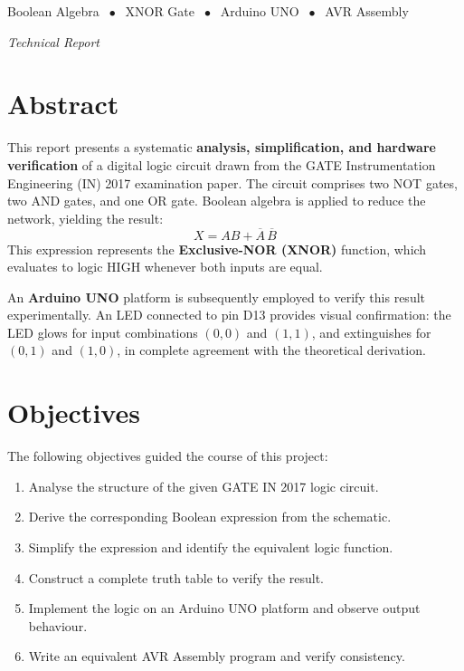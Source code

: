 \documentclass[12pt,a4paper]{article}
\begin{document}
\begin{titlepage}
\begin{center}
\vfill

\textcolor{accentblue}{%
Boolean Algebra $\;\bullet\;$
XNOR Gate $\;\bullet\;$
Arduino UNO $\;\bullet\;$
AVR Assembly
}

\vspace{0.3cm}
\textit{Technical Report}

\end{center}
\end{titlepage}

\tableofcontents
\newpage

\section{Abstract}

\begin{tcolorbox}[abstractbox, title={Overview}]
This report presents a systematic \textbf{analysis, simplification, and hardware
verification} of a digital logic circuit drawn from the GATE Instrumentation
Engineering (IN) 2017 examination paper. The circuit comprises two NOT gates,
two AND gates, and one OR gate. Boolean algebra is applied to reduce the
network, yielding the result:
\[
\boxed{X = AB + \overline{A}\,\overline{B}}
\]
This expression represents the \textbf{Exclusive-NOR (XNOR)} function, which
evaluates to logic HIGH whenever both inputs are equal.

An \textbf{Arduino UNO} platform is subsequently employed to verify this result
experimentally. An LED connected to pin D13 provides visual confirmation:
the LED glows for input combinations $(0,0)$ and $(1,1)$, and extinguishes for
$(0,1)$ and $(1,0)$, in complete agreement with the theoretical derivation.
\end{tcolorbox}

\section{Objectives}

The following objectives guided the course of this project:

\begin{enumerate}[label=\textcolor{accentblue}{\textbf{\arabic*.}}, leftmargin=*, itemsep=4pt]
    \item Analyse the structure of the given GATE IN 2017 logic circuit.
    \item Derive the corresponding Boolean expression from the schematic.
    \item Simplify the expression and identify the equivalent logic function.
    \item Construct a complete truth table to verify the result.
    \item Implement the logic on an Arduino UNO platform and observe output behaviour.
    \item Write an equivalent AVR Assembly program and verify consistency.
\end{enumerate}
\end{document}
